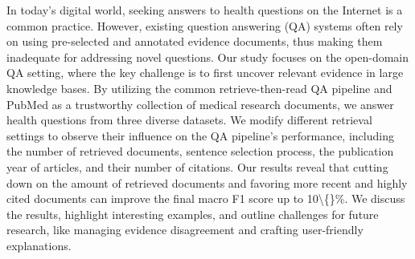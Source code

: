 In today's digital world, seeking answers to health questions on the Internet is a common practice. However, existing question answering (QA) systems often rely on using pre-selected and annotated evidence documents, thus making them inadequate for addressing novel questions. Our study focuses on the open-domain QA setting, where the key challenge is to first uncover relevant evidence in large knowledge bases. By utilizing the common retrieve-then-read QA pipeline and PubMed as a trustworthy collection of medical research documents, we answer health questions from three diverse datasets. We modify different retrieval settings to observe their influence on the QA pipeline's performance, including the number of retrieved documents, sentence selection process, the publication year of articles, and their number of citations. Our results reveal that cutting down on the amount of retrieved documents and favoring more recent and highly cited documents can improve the final macro F1 score up to 10\textbackslash\{\}\%. We discuss the results, highlight interesting examples, and outline challenges for future research, like managing evidence disagreement and crafting user-friendly explanations.